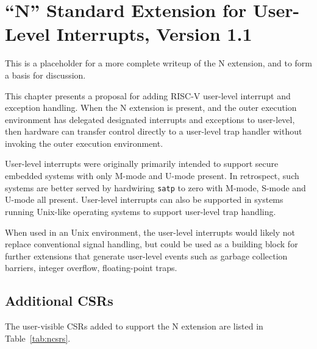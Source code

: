 \chapter{``N'' Standard Extension for User-Level Interrupts, Version 1.1}
\label{chap:n}

\begin{commentary}
  This is a placeholder for a more complete writeup of the N
  extension, and to form a basis for discussion.
\end{commentary}

This chapter presents a proposal for adding RISC-V user-level
interrupt and exception handling.  When the N extension is present,
and the outer execution environment has delegated designated
interrupts and exceptions to user-level, then hardware can transfer
control directly to a user-level trap handler without invoking the
outer execution environment.

\begin{commentary}
User-level interrupts were originally primarily intended to support secure
embedded systems with only M-mode and U-mode present.  In retrospect,
such systems are better served by hardwiring {\tt satp} to zero with
M-mode, S-mode and U-mode all present.  User-level interrupts can also be
supported in systems running Unix-like operating systems to support
user-level trap handling.

When used in an Unix environment, the user-level interrupts would
likely not replace conventional signal handling, but could be used as
a building block for further extensions that generate user-level
events such as garbage collection barriers, integer overflow,
floating-point traps.
\end{commentary}

\section{Additional CSRs}

The user-visible CSRs added to support the N extension are listed in
Table~\ref{tab:ncsrs}.

